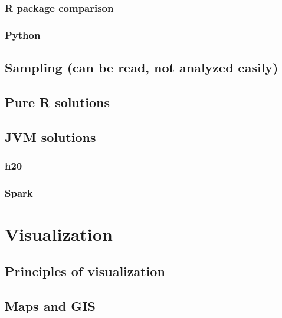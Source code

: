 \documentclass[]{book}
\theoremstyle{definition}
\theoremstyle{definition}
\theoremstyle{definition}
\theoremstyle{remark}
\begin{document}
\subsection{R package comparison}\label{r-package-comparison}

\subsection{Python}\label{python}

\section{Sampling (can be read, not analyzed
easily)}\label{sampling-can-be-read-not-analyzed-easily}

\section{Pure R solutions}\label{pure-r-solutions}

\section{JVM solutions}\label{jvm-solutions}

\subsection{h20}\label{h20}

\subsection{Spark}\label{spark}

\chapter{Visualization}\label{visualization}

\section{Principles of visualization}\label{principles-of-visualization}

\section{Maps and GIS}\label{maps-and-gis}


\end{document}
